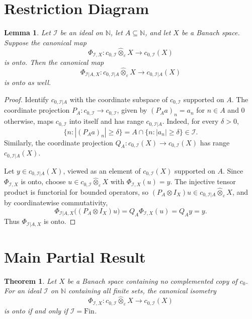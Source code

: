 \documentclass[11pt]{article}
\newtheorem{theorem}{Theorem}
\newtheorem{lemma}{Lemma}
\newcommand{\N}{\mathbb N}
\newcommand{\Fin}{\mathrm{Fin}}
\newcommand{\I}{\mathcal I}
\newcommand{\eps}{\varepsilon}
\begin{document}
\section*{Restriction Diagram}

\begin{lemma}
Let \(\I\) be an ideal on \(\N\), let \(A\subseteq\N\), and let \(X\) be a
Banach space.  Suppose the canonical map
\[
  \Phi_{\I,X}:c_{0,\I}\hat\otimes_\eps X\to c_{0,\I}(X)
\]
is onto.  Then the canonical map
\[
  \Phi_{\I|A,X}:c_{0,\I|A}\hat\otimes_\eps X\to c_{0,\I|A}(X)
\]
is onto as well.
\end{lemma}

\begin{proof}
Identify \(c_{0,\I|A}\) with the coordinate subspace of \(c_{0,\I}\) supported
on \(A\).  The coordinate projection \(P_A:c_{0,\I}\to c_{0,\I}\), given by
\((P_A a)_n=a_n\) for \(n\in A\) and \(0\) otherwise, maps \(c_{0,\I}\) into
itself and has range \(c_{0,\I|A}\).  Indeed, for every \(\delta>0\),
\[
  \{n: |(P_Aa)_n|\geq \delta\}
  =
  A\cap \{n: |a_n|\geq \delta\}\in \I.
\]
Similarly, the coordinate projection \(Q_A:c_{0,\I}(X)\to c_{0,\I}(X)\) has
range \(c_{0,\I|A}(X)\).

Let \(y\in c_{0,\I|A}(X)\), viewed as an element of \(c_{0,\I}(X)\) supported
on \(A\).  Since \(\Phi_{\I,X}\) is onto, choose
\(u\in c_{0,\I}\hat\otimes_\eps X\) with \(\Phi_{\I,X}(u)=y\).  The injective
tensor product is functorial for bounded operators, so
\((P_A\otimes I_X)u\in c_{0,\I|A}\hat\otimes_\eps X\), and by coordinatewise
commutativity,
\[
  \Phi_{\I|A,X}\big((P_A\otimes I_X)u\big)
  =
  Q_A\Phi_{\I,X}(u)
  =
  Q_Ay
  =
  y.
\]
Thus \(\Phi_{\I|A,X}\) is onto.
\end{proof}

\section*{Main Partial Result}

\begin{theorem}
Let \(X\) be a Banach space containing no complemented copy of \(c_0\).  For an
ideal \(\I\) on \(\N\) containing all finite sets, the canonical isometry
\[
  \Phi_{\I,X}:c_{0,\I}\hat\otimes_\eps X\to c_{0,\I}(X)
\]
is onto if and only if \(\I=\Fin\).
\end{theorem}
\end{document}
